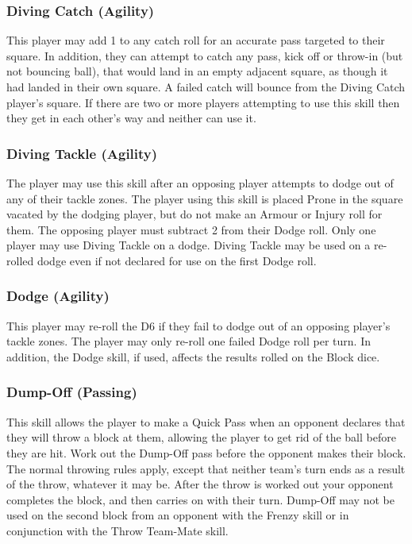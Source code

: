 \begin{multicols}{3}
\subsubsection{Diving Catch (Agility)}
\par This player may add 1 to any catch roll for an accurate pass targeted to their square. In addition, they can attempt to catch any pass, kick off or throw-in (but not bouncing ball), that would land in an empty adjacent square, as though it had landed in their own square. A failed catch will bounce from the Diving Catch player's square. If there are two or more players attempting to use this skill then they get in each other's way and neither can use it.

\subsubsection{Diving Tackle (Agility)}
\par The player may use this skill after an opposing player attempts to dodge out of any of their tackle zones. The player using this skill is placed Prone in the square vacated by the dodging player, but do not make an Armour or Injury roll for them. The opposing player must subtract 2 from their Dodge roll. Only one player may use Diving Tackle on a dodge. Diving Tackle may be used on a re-rolled dodge even if not declared for use on the first Dodge roll.

\subsubsection{Dodge (Agility)}
\par This player may re-roll the D6 if they fail to dodge out of an opposing player's tackle zones. The player may only re-roll one failed Dodge roll per turn. In addition, the Dodge skill, if used, affects the results rolled on the Block dice.

\subsubsection{Dump-Off (Passing)}
\par This skill allows the player to make a Quick Pass when an opponent declares that they will throw a block at them, allowing the player to get rid of the ball before they are hit. Work out the Dump-Off pass before the opponent makes their block. The normal throwing rules apply, except that neither team's turn ends as a result of the throw, whatever it may be. After the throw is worked out your opponent completes the block, and then carries on with their turn. Dump-Off may not be used on the second block from an opponent with the Frenzy skill or in conjunction with the Throw Team-Mate skill.


\end{multicols}
